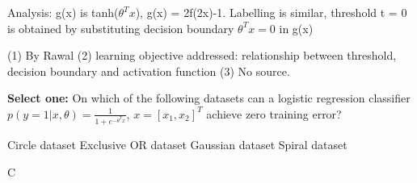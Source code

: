 \begin{questions}
\begin{soln}
    Analysis:
    g(x) is tanh($\theta^Tx$), g(x) = 2f(2x)-1. Labelling is similar, threshold t = 0 is obtained by substituting decision boundary $\theta^Tx=0$ in g(x)
    
    \end{soln}
    \begin{qauthor}
    (1) By Rawal 
    (2) learning objective addressed: relationship between threshold, decision boundary and activation function
    (3) No source.
    \end{qauthor}
    
\question [] \textbf{Select one:} On which of the following datasets can a logistic regression classifier $p(y=1|x,\theta)=\frac{1}{1+e^{-\theta^T x}}$, $x = [x_1, x_2]^T$  achieve zero training error? 

\begin{figure}[H]
    \centering
\end{figure}

    {%
    \begin{checkboxes}
     \choice Circle dataset
     \choice Exclusive OR dataset
     \choice Gaussian dataset
     \choice Spiral dataset
    \end{checkboxes}
    }
    \begin{soln}
    C
    

\end{soln}
\end{questions}
